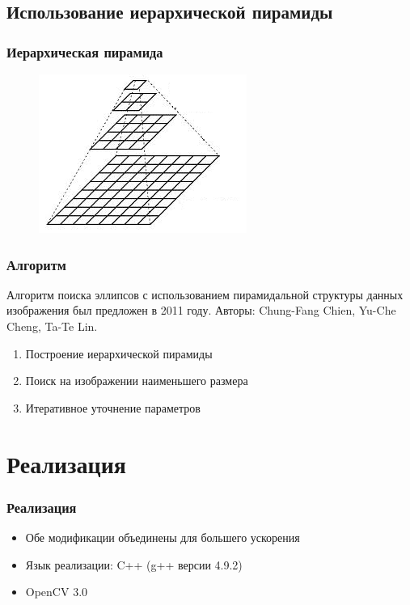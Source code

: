 \documentclass[14pt]{beamer}
\begin{document}
\subsection{Использование иерархической пирамиды}
\begin{frame}
\frametitle{Иерархическая пирамида}
\begin{figure}[H]
  \center
  \includegraphics[width=0.6\linewidth]{Pyramid}
\end{figure}
\end{frame}

\begin{frame}
\frametitle{Алгоритм}
Алгоритм поиска эллипсов с использованием пирамидальной структуры данных изображения был предложен в 2011 году. Авторы: Chung-Fang Chien, Yu-Che Cheng, Ta-Te Lin.
\begin{enumerate}
  \item Построение иерархической пирамиды
  \item Поиск на изображении наименьшего размера
  \item Итеративное уточнение параметров
\end{enumerate}
\end{frame}

\section{Реализация}
\begin{frame}
\frametitle{Реализация}
\begin{itemize}
  \item Обе модификации объединены для большего ускорения
  \item Язык реализации: C++ (g++ версии 4.9.2)
  \item OpenCV 3.0
\end{itemize}
\end{frame}
\end{document}
